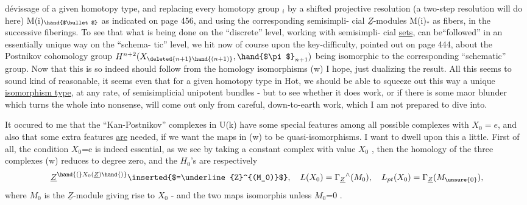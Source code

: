 dévissage of a given homotopy type,  and replacing every homotopy group \hand{$\pi$}$_i$
by a shifted projective resolution (a two-step resolution will do here)
M(i)$_{\hand{$\bullet$}}$\hand{,}  as indicated on page 456,  and using the corresponding semisimpli-%
cial $\underline{Z}$-modules  M(i)$_*$  as fibers,  in the successive fiberings.  To see
that what is being done on the ``discrete'' level,  working with semisimpli-%
cial \uline{sets},  can be``followed'' in an essentially unique way on the ``schema-%
tic'' level,  we hit now of course upon the key-difficulty,  pointed out
on page 444,  about the Postnikov cohomology group $H^{n+2}(X_{\deleted{n+1}\hand{(n+1)}},\hand{$\pi$}_{n+1})$
being isomorphic to the corresponding ``schematic'' group.  Now that this is
so indeed should follow from the homology isomorphisms (w) I hope,
 just dualizing the result.  All this seems to
sound kind of reasonable,  it seems even that for a given homotopy type
in Hot,  we should be able to squeeze out this way a unique \uline{isomorphism
type},  at any rate,  of semisimplicial unipotent bundles  -  but to see
whether it does work,  or if there is some maor blunder which turns
the whole into nonsense,  will come out only from careful, down-to-earth
work,  which I am not prepared to dive into.

It occured to me that the ``Kan-Postnikov'' complexes in U(k) have
some special features among all possible complexes with $X_0 = e$,  and also
that some extra features \uline{are}  needed,  if we want the maps in (w) to be
quasi-isomorphisms.  I want to dwell upon this a little.  First of all,
the condition  $X_0$=e is indeed essential,  as we see by taking a constant
complex with value $X_0$ ,  then the homology of the three complexes
(w)  reduces to degree zero,  and the $H_0$'s are respectively
\[ \underline{Z}^{\hand{(}X_0(\underline{Z})\hand{)}}\inserted{$=\underline{Z}^{(M_0)}$} ,\quad L(X_0) = \Gamma_{\underline{Z}}{}^{\wedge}(M_0) ,\quad L_{pt}(X_0) = \Gamma_{\underline{Z}}(M_{\unsure{0}}) , \]
where $M_0$ is the $\underline{Z}$-module giving rise to $X_0$  -  and  the two maps 
 isomorphis\hand{,} unless $M_0$=0 .

